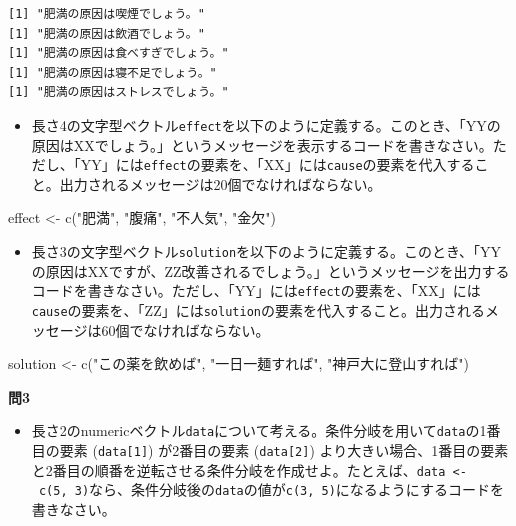 \documentclass[
  a4paper,
  pandoc,
  ja=standard,
  jafont=haranoaji]{bxjsbook}
\newenvironment{Shaded}{\begin{snugshade}}{\end{snugshade}}
\newcommand{\FunctionTok}[1]{\textcolor[rgb]{0.28,0.35,0.67}{#1}}
\newcommand{\NormalTok}[1]{\textcolor[rgb]{0.00,0.48,0.65}{#1}}
\newcommand{\OtherTok}[1]{\textcolor[rgb]{0.00,0.48,0.65}{#1}}
\newcommand{\StringTok}[1]{\textcolor[rgb]{0.13,0.47,0.30}{#1}}
\providecommand{\tightlist}{%
  \setlength{\itemsep}{0pt}\setlength{\parskip}{0pt}}
\begin{document}
\begin{verbatim}
[1] "肥満の原因は喫煙でしょう。"
[1] "肥満の原因は飲酒でしょう。"
[1] "肥満の原因は食べすぎでしょう。"
[1] "肥満の原因は寝不足でしょう。"
[1] "肥満の原因はストレスでしょう。"
\end{verbatim}

\begin{itemize}
\tightlist
\item
  長さ4の文字型ベクトル\texttt{effect}を以下のように定義する。このとき、「YYの原因はXXでしょう。」というメッセージを表示するコードを書きなさい。ただし、「YY」には\texttt{effect}の要素を、「XX」には\texttt{cause}の要素を代入すること。出力されるメッセージは20個でなければならない。
\end{itemize}

\begin{Shaded}
\begin{Highlighting}[numbers=left,,]
\NormalTok{effect }\OtherTok{\textless{}{-}} \FunctionTok{c}\NormalTok{(}\StringTok{"肥満"}\NormalTok{, }\StringTok{"腹痛"}\NormalTok{, }\StringTok{"不人気"}\NormalTok{, }\StringTok{"金欠"}\NormalTok{)}
\end{Highlighting}
\end{Shaded}

\begin{itemize}
\tightlist
\item
  長さ3の文字型ベクトル\texttt{solution}を以下のように定義する。このとき、「YYの原因はXXですが、ZZ改善されるでしょう。」というメッセージを出力するコードを書きなさい。ただし、「YY」には\texttt{effect}の要素を、「XX」には\texttt{cause}の要素を、「ZZ」には\texttt{solution}の要素を代入すること。出力されるメッセージは60個でなければならない。
\end{itemize}

\begin{Shaded}
\begin{Highlighting}[numbers=left,,]
\NormalTok{solution }\OtherTok{\textless{}{-}} \FunctionTok{c}\NormalTok{(}\StringTok{"この薬を飲めば"}\NormalTok{, }\StringTok{"一日一麺すれば"}\NormalTok{, }\StringTok{"神戸大に登山すれば"}\NormalTok{)}
\end{Highlighting}
\end{Shaded}

\textbf{問3}

\begin{itemize}
\tightlist
\item
  長さ2のnumericベクトル\texttt{data}について考える。条件分岐を用いて\texttt{data}の1番目の要素
  (\texttt{data{[}1{]}}) が2番目の要素 (\texttt{data{[}2{]}})
  より大きい場合、1番目の要素と2番目の順番を逆転させる条件分岐を作成せよ。たとえば、\texttt{data\ \textless{}-\ c(5,\ 3)}なら、条件分岐後の\texttt{data}の値が\texttt{c(3,\ 5)}になるようにするコードを書きなさい。
\end{itemize}
\end{document}
